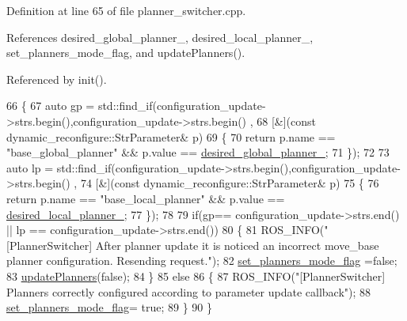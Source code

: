 Definition at line 65 of file planner\+\_\+switcher.\+cpp.



References desired\+\_\+global\+\_\+planner\+\_\+, desired\+\_\+local\+\_\+planner\+\_\+, set\+\_\+planners\+\_\+mode\+\_\+flag, and update\+Planners().



Referenced by init().


\begin{DoxyCode}
66 \{
67   \textcolor{keyword}{auto} gp = std::find\_if(configuration\_update->strs.begin(),configuration\_update->strs.begin() ,
68               [&](\textcolor{keyword}{const} dynamic\_reconfigure::StrParameter& p)
69               \{
70                   \textcolor{keywordflow}{return} p.name == \textcolor{stringliteral}{"base\_global\_planner"} &&  p.value == 
      \hyperlink{classsmacc__planner__switcher_1_1PlannerSwitcher_aed229df648a0903e3cdf77682220efb5}{desired\_global\_planner\_};
71               \});
72 
73   \textcolor{keyword}{auto} lp = std::find\_if(configuration\_update->strs.begin(),configuration\_update->strs.begin() ,
74               [&](\textcolor{keyword}{const} dynamic\_reconfigure::StrParameter& p)
75               \{
76                 \textcolor{keywordflow}{return} p.name == \textcolor{stringliteral}{"base\_local\_planner"} &&  p.value == 
      \hyperlink{classsmacc__planner__switcher_1_1PlannerSwitcher_aecc5958653ed39dd7611783043d23345}{desired\_local\_planner\_};
77               \});
78 
79   \textcolor{keywordflow}{if}(gp== configuration\_update->strs.end() ||  lp == configuration\_update->strs.end())
80     \{
81       ROS\_INFO(\textcolor{stringliteral}{"[PlannerSwitcher] After planner update it is noticed an incorrect move\_base planner
       configuration. Resending request."});
82       \hyperlink{classsmacc__planner__switcher_1_1PlannerSwitcher_a266b7a17a8c92bda2d74a7c8991a4a61}{set\_planners\_mode\_flag} =\textcolor{keyword}{false};
83       \hyperlink{classsmacc__planner__switcher_1_1PlannerSwitcher_ae45c57b459f1eb9ee4cc3c6dc6dc0995}{updatePlanners}(\textcolor{keyword}{false});
84     \}
85     \textcolor{keywordflow}{else}
86     \{
87       ROS\_INFO(\textcolor{stringliteral}{"[PlannerSwitcher] Planners correctly configured according to parameter update callback"});
88       \hyperlink{classsmacc__planner__switcher_1_1PlannerSwitcher_a266b7a17a8c92bda2d74a7c8991a4a61}{set\_planners\_mode\_flag}= \textcolor{keyword}{true};
89     \}
90 \}
\end{DoxyCode}


